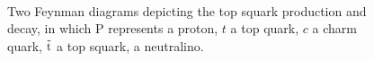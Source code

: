 \begin{figure}[ht!]
  \begin{center}
     \\
      \caption{Two Feynman diagrams depicting the top squark production
      and decay, in which P represents a proton, $t$ a top quark, $c$ a charm
      quark, $\tilde{\rm t}$ a top squark, \chiOnez a neutralino.}
    \label{fig:feynman_sms}
  \end{center}
\end{figure}

